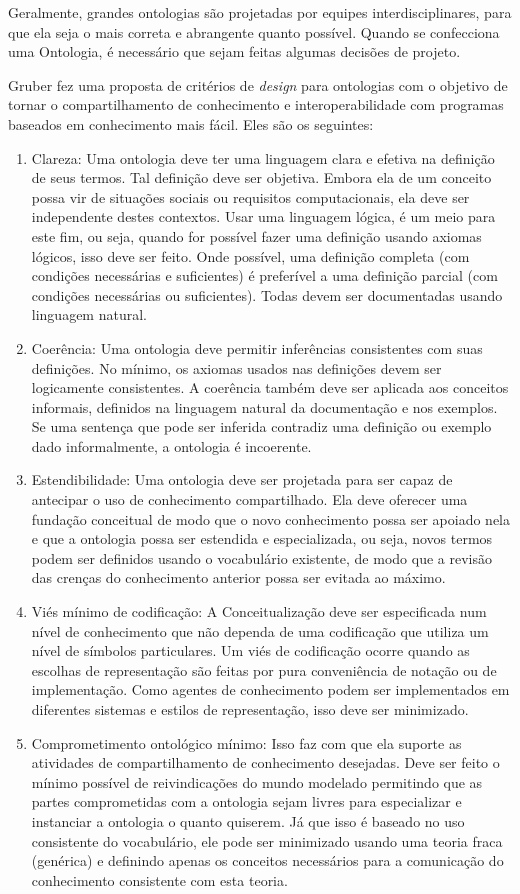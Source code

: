 Geralmente, grandes ontologias são projetadas por equipes interdisciplinares, para que ela seja o mais correta e abrangente quanto possível. Quando se confecciona uma Ontologia, é necessário que sejam feitas algumas decisões de projeto.  

Gruber \cite{ontoGruber} fez uma proposta de critérios de \textit{design} para ontologias com o objetivo de tornar o compartilhamento de conhecimento e interoperabilidade com programas baseados em conhecimento mais fácil. Eles são os seguintes:

\begin{enumerate}
	\item Clareza: Uma ontologia deve ter uma linguagem clara e efetiva na definição de seus termos. Tal definição deve ser objetiva. Embora ela de um conceito possa vir de situações sociais ou requisitos computacionais, ela deve ser independente destes contextos. Usar uma linguagem lógica, é um meio para este fim, ou seja, quando for possível fazer uma definição usando axiomas lógicos, isso deve ser feito. Onde possível, uma definição completa (com condições necessárias e suficientes) é preferível a uma definição parcial (com condições necessárias ou suficientes). Todas devem ser documentadas usando linguagem natural.
	\item Coerência: Uma ontologia deve permitir inferências consistentes com suas definições. No mínimo, os axiomas usados nas definições devem ser logicamente consistentes. A coerência também deve ser aplicada aos conceitos informais, definidos na linguagem natural da documentação e nos exemplos. Se uma sentença que pode ser inferida contradiz uma definição ou exemplo dado informalmente, a ontologia é incoerente.
	\item Estendibilidade: Uma ontologia deve ser projetada para ser capaz de antecipar o uso de conhecimento compartilhado. Ela deve oferecer uma fundação conceitual de modo que o novo conhecimento possa ser apoiado nela e que a ontologia possa ser estendida e especializada, ou seja, novos termos podem ser definidos usando o vocabulário existente, de modo que a revisão das crenças do conhecimento anterior possa ser evitada ao máximo.
	\item Viés mínimo de codificação: A Conceitualização deve ser especificada num nível de conhecimento que não dependa de uma codificação que utiliza um nível de símbolos particulares. Um viés de codificação ocorre quando as escolhas de representação são feitas por pura conveniência de notação ou de implementação. Como agentes de conhecimento podem ser implementados em diferentes sistemas e estilos de representação, isso deve ser minimizado.
	\item Comprometimento ontológico mínimo: Isso faz com que ela suporte as atividades de compartilhamento de conhecimento desejadas. Deve ser feito o mínimo possível de reivindicações do mundo modelado permitindo que as partes comprometidas com a ontologia sejam livres para especializar e instanciar a ontologia o quanto quiserem. Já que isso é baseado no uso consistente do vocabulário, ele pode ser minimizado usando uma teoria fraca (genérica) e definindo apenas os conceitos necessários para a comunicação do conhecimento consistente com esta teoria.
\end{enumerate}

